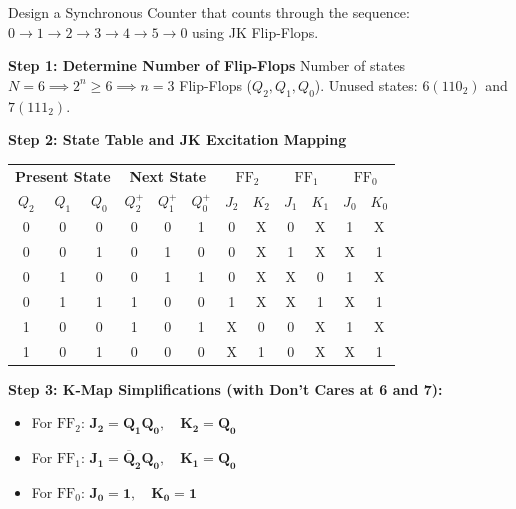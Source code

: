 \begin{example}
Design a Synchronous Counter that counts through the sequence: $0 \rightarrow 1 \rightarrow 2 \rightarrow 3 \rightarrow 4 \rightarrow 5 \rightarrow 0$ using JK Flip-Flops.

\tcblower
\textbf{Step 1: Determine Number of Flip-Flops}
Number of states $N = 6 \implies 2^n \ge 6 \implies n = 3$ Flip-Flops ($Q_2, Q_1, Q_0$).
Unused states: $6 (110_2)$ and $7 (111_2)$.

\textbf{Step 2: State Table and JK Excitation Mapping}
\begin{center}
\small
\begin{tabular}{ccc|ccc|cc|cc|cc}
\toprule
\multicolumn{3}{c|}{\textbf{Present State}} & \multicolumn{3}{c|}{\textbf{Next State}} & \multicolumn{2}{c|}{\textbf{$\text{FF}_2$}} & \multicolumn{2}{c|}{\textbf{$\text{FF}_1$}} & \multicolumn{2}{c}{\textbf{$\text{FF}_0$}} \\
$Q_2$ & $Q_1$ & $Q_0$ & $Q_2^+$ & $Q_1^+$ & $Q_0^+$ & $J_2$ & $K_2$ & $J_1$ & $K_1$ & $J_0$ & $K_0$ \\
\midrule
0 & 0 & 0 & 0 & 0 & 1 & 0 & X & 0 & X & 1 & X \\
0 & 0 & 1 & 0 & 1 & 0 & 0 & X & 1 & X & X & 1 \\
0 & 1 & 0 & 0 & 1 & 1 & 0 & X & X & 0 & 1 & X \\
0 & 1 & 1 & 1 & 0 & 0 & 1 & X & X & 1 & X & 1 \\
1 & 0 & 0 & 1 & 0 & 1 & X & 0 & 0 & X & 1 & X \\
1 & 0 & 1 & 0 & 0 & 0 & X & 1 & 0 & X & X & 1 \\
\bottomrule
\end{tabular}
\end{center}

\textbf{Step 3: K-Map Simplifications (with Don't Cares at 6 and 7):}
\begin{itemize}
    \item For $\text{FF}_2$: $\mathbf{J_2 = Q_1 Q_0}, \quad \mathbf{K_2 = Q_0}$
    \item For $\text{FF}_1$: $\mathbf{J_1 = \overline{Q}_2 Q_0}, \quad \mathbf{K_1 = Q_0}$
    \item For $\text{FF}_0$: $\mathbf{J_0 = 1}, \quad \mathbf{K_0 = 1}$
\end{itemize}


\end{example}
